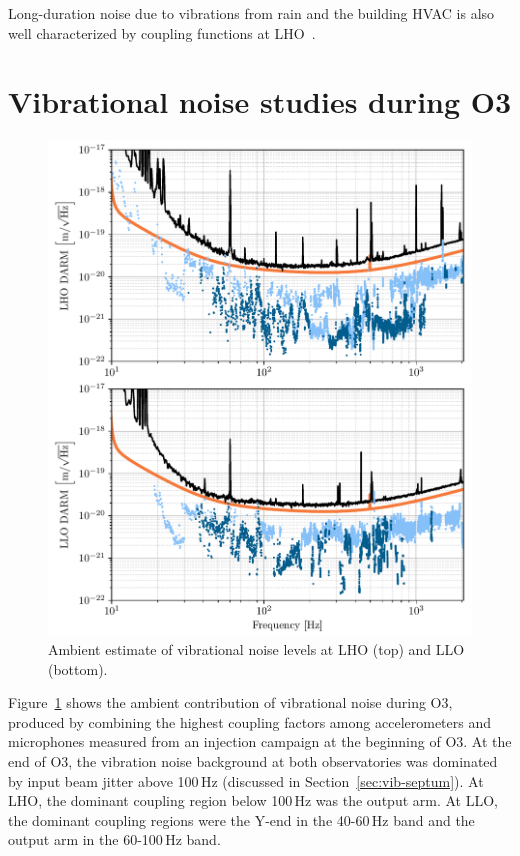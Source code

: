 Long-duration noise due to vibrations from rain and the building \ac{HVAC} is also well characterized by coupling functions at \ac{LHO}~\citep{alog_rain, alog_hvac_coupling}.

\section{Vibrational noise studies during O3}\label{sec:vib}

\begin{figure}
	\centering
	\includegraphics{figures/noise-studies/vib-ambient.pdf}
	\caption{
		Ambient estimate of vibrational noise levels at LHO (top) and LLO (bottom).}
	\label{fig:vib-ambient}
\end{figure}

Figure~\ref{fig:vib-ambient} shows the ambient contribution of vibrational noise during \ac{O3}, produced by combining the highest coupling factors among accelerometers and microphones measured from an injection campaign at the beginning of \ac{O3}.
At the end of \ac{O3}, the vibration noise background at both observatories was dominated by input beam jitter above 100\,Hz (discussed in Section~\ref{sec:vib-septum}).
At \ac{LHO},  the dominant coupling region below 100\,Hz was the output arm.
At \ac{LLO}, the dominant coupling regions were the Y-end in the 40-60\,Hz band and the output arm in the 60-100\,Hz band.


